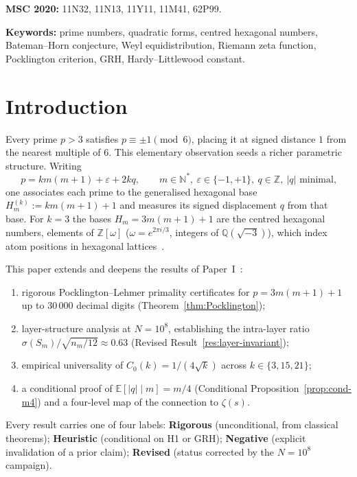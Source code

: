 \documentclass[11pt,a4paper]{article}
\theoremstyle{definition}
\theoremstyle{remark}
\newcommand{\N}{\mathbb{N}}
\newcommand{\Z}{\mathbb{Z}}
\newcommand{\E}{\mathbb{E}}
\newcommand{\eps}{\varepsilon}
\begin{document}
\noindent\textbf{MSC 2020:} 11N32, 11N13, 11Y11, 11M41, 62P99.

\smallskip
\noindent\textbf{Keywords:} prime numbers, quadratic forms, centred
hexagonal numbers, Bateman--Horn conjecture, Weyl equidistribution,
Riemann zeta function, Pocklington criterion, GRH, Hardy--Littlewood
constant.

\tableofcontents
\listoffigures

\section{Introduction}\label{sec:intro}

Every prime $p>3$ satisfies $p\equiv\pm 1\pmod 6$, placing it at
signed distance $1$ from the nearest multiple of $6$. This elementary
observation seeds a richer parametric structure. Writing
\[
  p=km(m+1)+\eps+2kq,\qquad m\in\N^{*},\ \eps\in\{-1,+1\},\ q\in\Z,\
  |q|\text{ minimal,}
\]
one associates each prime to the generalised hexagonal base
$H_{m}^{(k)}:=km(m+1)+1$ and measures its signed displacement $q$
from that base. For $k=3$ the bases $H_{m}=3m(m+1)+1$ are the centred
hexagonal numbers, elements of $\Z[\omega]$
($\omega=e^{2\pi i/3}$, integers of $\mathbb{Q}(\sqrt{-3})$), which
index atom positions in hexagonal lattices~\cite{Cox1989}.

This paper extends and deepens the results of Paper~I~\cite{PaperI}:
\begin{enumerate}[label=(\roman*)]
\item rigorous Pocklington--Lehmer primality certificates for
  $p=3m(m+1)+1$ up to $30\,000$ decimal digits
  (Theorem~\ref{thm:Pocklington});
\item layer-structure analysis at $N=10^{8}$, establishing the
  intra-layer ratio $\sigma(S_{m})/\sqrt{n_{m}/12}\approx 0.63$
  (Revised Result~\ref{res:layer-invariant});
\item empirical universality of $C_{0}(k)=1/(4\sqrt{k})$ across
  $k\in\{3,15,21\}$;
\item a conditional proof of $\E[|q|\mid m]=m/4$ (Conditional
  Proposition~\ref{prop:cond-m4}) and a four-level map of the
  connection to $\zeta(s)$.
\end{enumerate}

\begin{keybox}
Every result carries one of four labels:
\textbf{Rigorous} (unconditional, from classical theorems);
\textbf{Heuristic} (conditional on H1 or GRH);
\textbf{Negative} (explicit invalidation of a prior claim);
\textbf{Revised} (status corrected by the $N=10^{8}$ campaign).
\end{keybox}
\end{document}
